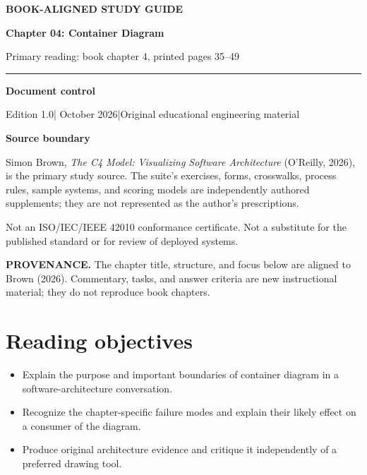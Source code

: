 \documentclass[10pt,letterpaper]{article}
\newcommand{\SourceNote}[1]{\par\smallskip\noindent\colorbox{C4Light}{\parbox{0.94\linewidth}{\footnotesize\textbf{PROVENANCE.} #1}}\par\medskip}
\newcommand{\DocStart}[3]{%
\begin{document}
\begin{titlepage}
\renewcommand{\thepage}{title-\arabic{page}}
\vspace*{0.55in}
{\sffamily\bfseries\small\color{C4Teal}#1}\par\vspace{0.24in}
{\sffamily\bfseries\fontsize{26}{31}\selectfont\color{C4Navy}#2}\par\vspace{0.18in}
{\large\color{C4Gray}#3}\par\vspace{0.4in}
\textcolor{C4Teal}{\rule{\linewidth}{1.15pt}}\par\vspace{0.24in}
\textbf{Document control}\par
Edition 1.0\quad|\quad 30 October 2026\quad|\quad Original educational engineering material\par
\vspace{0.17in}
\textbf{Source boundary}\par
Simon Brown, \emph{The C4 Model: Visualizing Software Architecture} (O'Reilly, 2026), is the primary study source. The suite's exercises, forms, crosswalks, process rules, sample systems, and scoring models are independently authored supplements; they are not represented as the author's prescriptions.\par
\vfill
{\small\color{C4Gray}Not an ISO/IEC/IEEE 42010 conformance certificate. Not a substitute for the published standard or for review of deployed systems.}\par
\end{titlepage}
}
\DocStart{BOOK-ALIGNED STUDY GUIDE}{Chapter 04: Container Diagram}{Primary reading: book chapter 4, printed pages 35–49}
\SourceNote{The chapter title, structure, and focus below are aligned to Brown (2026). Commentary, tasks, and answer criteria are new instructional material; they do not reproduce book chapters.}
\section{Reading objectives}
\begin{itemize}
\item Explain the purpose and important boundaries of container diagram in a software-architecture conversation.
\item Recognize the chapter-specific failure modes and explain their likely effect on a consumer of the diagram.
\item Produce original architecture evidence and critique it independently of a preferred drawing tool.
\end{itemize}
\end{document}
